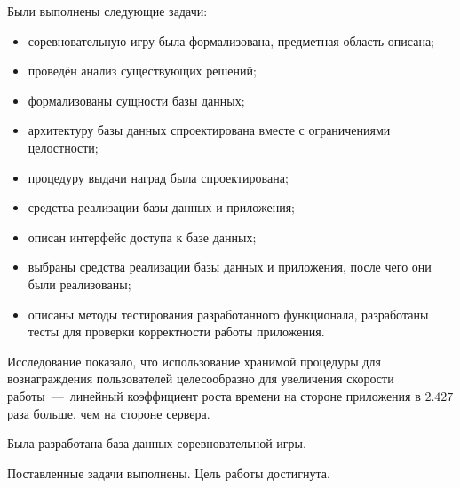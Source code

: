 
Были выполнены следующие задачи:
\begin{itemize}
	\item соревновательную игру была формализована, предметная область описана;
	\item проведён анализ существующих решений;
	\item формализованы сущности базы данных;
	\item архитектуру базы данных спроектирована вместе с ограничениями целостности;
	\item процедуру выдачи наград была спроектирована;
	\item средства реализации базы данных и приложения;
	\item описан интерфейс доступа к базе данных; 
	\item выбраны средства реализации базы данных и приложения, после чего они были реализованы;
	\item описаны методы тестирования разработанного функционала, разработаны тесты для проверки корректности работы приложения.
\end{itemize}

Исследование показало, что использование хранимой процедуры для вознаграждения пользователей целесообразно для увеличения скорости работы~---~линейный коэффициент роста времени на стороне приложения в $2.427$ раза больше, чем на стороне сервера.

Была разработана база данных соревновательной игры.

Поставленные задачи выполнены. Цель работы достигнута.
